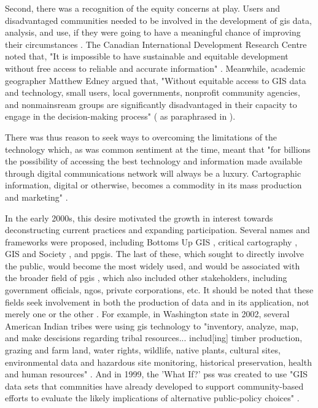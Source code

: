 Second, there was a recognition of the equity concerns at play. Users and disadvantaged communities needed to be involved in the development of \ac{gis} data, analysis, and use, if they were going to have a meaningful chance of improving their circumstances \cite{talenBottomUpGIS2000}. The Canadian International Development Research Centre noted that, "It is impossible to have sustainable and equitable development without free access to reliable and accurate information" \cite{benmouffokInformationDecisionMaking1993}. Meanwhile, academic geographer Matthew Edney argued that, "Without equitable access to GIS data and technology, small users, local governments, nonprofit community agencies, and nonmainsream groups are significantly disadvantaged in their capacity to engage in the decision-making process" (\cite{edney1991strategies} as paraphrased in \cite{harrisPursuingSocialGoals1994}). 

There was thus reason to seek ways to overcoming the limitations of the technology which, as was common sentiment at the time, meant that "for billions the possibility of accessing the best technology and information made available through digital communications network will always be a luxury. Cartographic information, digital or otherwise, becomes a commodity in its mass production and marketing" \cite{mchaffieManufacturingMetaphors1994}. 

In the early 2000s, this desire motivated the growth in interest towards deconstructing current practices and expanding participation. Several names and frameworks were proposed, including Bottoms Up GIS \cite{talenBottomUpGIS2000}, critical cartography \cite{cramptonIntroductionCriticalCartography2005, kimCriticalCartographyParticipatory2015}, GIS and Society \cite{sieberPublicParticipationGeographic2006}, and \ac{ppgis}. The last of these, which sought to directly involve the public, would become the most widely used, and would be associated with the broader field of \ac{pgis} \cite{sieberPublicParticipationGeographic2006}, which also included other stakeholders, including government officials, \acp{ngo}, private corporations, etc. It should be noted that these fields seek involvement in both the production of data and in its application, not merely one or the other \cite{weinerParticipatoryGeographicInformation2007, talenBottomUpGIS2000}. For example, in Washington state in 2002, several American Indian tribes were using \ac{gis} technology to "inventory, analyze, map, and make descisions regarding tribal resources... includ[ing] timber production, grazing and farm land, water rights, wildlife, native plants, cultural sites, environmental data and hazardous site monitoring, historical preservation, health and human resources" \cite{bondCherokeeNationTribal2002}. And in 1999, the 'What If?' \ac{pss} was created to use "GIS data sets that commnities have already developed to support community-based efforts to evaluate the likely implications of alternative public-policy choices" \cite{klostermanWhatIfCollaborative1999}. 

